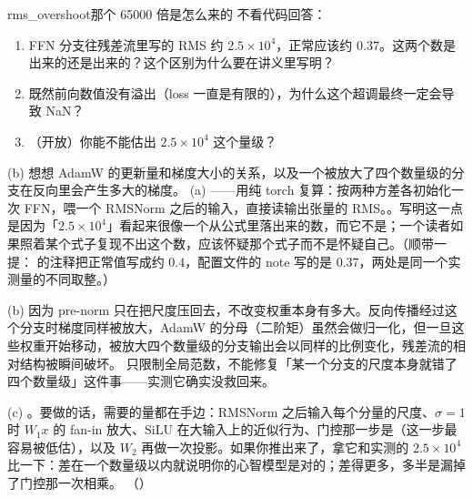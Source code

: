 \begin{checkpoint}{rms_overshoot}{那个 65000 倍是怎么来的}
不看代码回答：
\begin{enumerate}[label=(\alph*)]
  \item FFN 分支往残差流里写的 RMS 约 $2.5\times10^{4}$，正常应该约 $0.37$。这两个数是出来的还是出来的？这个区别为什么要在讲义里写明？
  \item 既然前向数值没有溢出（loss 一直是有限的），为什么这个超调最终一定会导致 NaN？
  \item （开放）你能不能估出 $2.5\times10^{4}$ 这个量级？
\end{enumerate}
\hint (b) 想想 AdamW 的更新量和梯度大小的关系，以及一个被放大了四个数量级的分支在反向里会产生多大的梯度。
\ifshowanswers
\tcblower
\answer (a) ——用纯 torch 复算：按两种方差各初始化一次 FFN，喂一个 RMSNorm 之后的输入，直接读输出张量的 RMS。。写明这一点是因为「$2.5\times10^{4}$」看起来很像一个从公式里落出来的数，而它不是；一个读者如果照着某个式子复现不出这个数，应该怀疑那个式子而不是怀疑自己。（顺带一提： 的注释把正常值写成约 $0.4$，配置文件的 note 写的是 $0.37$，两处是同一个实测量的不同取整。）

(b) 因为 pre-norm 只在把尺度压回去，不改变权重本身有多大。反向传播经过这个分支时梯度同样被放大，AdamW 的分母（二阶矩）虽然会做归一化，但一旦这些权重开始移动，被放大四个数量级的分支输出会以同样的比例变化，残差流的相对结构被瞬间破坏。 只限制全局范数，不能修复「某一个分支的尺度本身就错了四个数量级」这件事——实测它确实没救回来。

(c) 。要做的话，需要的量都在手边：RMSNorm 之后输入每个分量的尺度、$\sigma=1$ 时 $W_1x$ 的 fan-in 放大、SiLU 在大输入上的近似行为、门控那一步是（这一步最容易被低估），以及 $W_2$ 再做一次投影。如果你推出来了，拿它和实测的 $2.5\times10^{4}$ 比一下：差在一个数量级以内就说明你的心智模型是对的；差得更多，多半是漏掉了门控那一次相乘。
\whereincode {}（）
\fi
\end{checkpoint}

